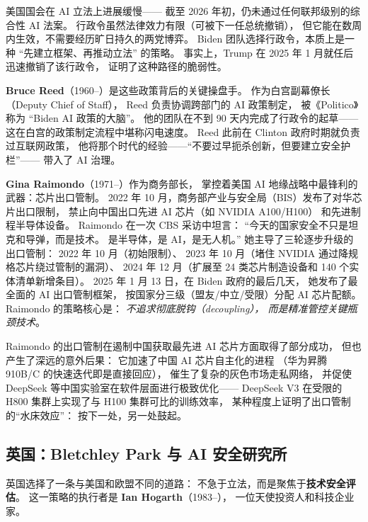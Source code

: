 \begin{whybox}[为什么行政令而非立法？]
美国国会在 AI 立法上进展缓慢——
截至 2026 年初，仍未通过任何联邦级别的综合性 AI 法案。
行政令虽然法律效力有限（可被下一任总统撤销），
但它能在数周内生效，不需要经历旷日持久的两党博弈。
Biden 团队选择行政令，本质上是一种
``先建立框架、再推动立法'' 的策略。
事实上，Trump 在 2025 年 1 月就任后迅速撤销了该行政令，
证明了这种路径的脆弱性。
\end{whybox}

\textbf{Bruce Reed}（1960--）是这些政策背后的关键操盘手。
作为白宫副幕僚长（Deputy Chief of Staff），
Reed 负责协调跨部门的 AI 政策制定，
被《Politico》称为 ``Biden AI 政策的大脑''。
他的团队在不到 90 天内完成了行政令的起草——
这在白宫的政策制定流程中堪称闪电速度。
Reed 此前在 Clinton 政府时期就负责过互联网政策，
他将那个时代的经验——``不要过早扼杀创新，但要建立安全护栏''——
带入了 AI 治理。

\textbf{Gina Raimondo}（1971--）作为商务部长，
掌控着美国 AI 地缘战略中最锋利的武器：芯片出口管制。
2022 年 10 月，商务部产业与安全局（BIS）发布了对华芯片出口限制，
禁止向中国出口先进 AI 芯片（如 NVIDIA A100/H100）
和先进制程半导体设备。
Raimondo 在一次 CBS 采访中坦言：
``今天的国家安全不只是坦克和导弹，而是技术。
是半导体，是 AI，是无人机。''
她主导了三轮逐步升级的出口管制：
2022 年 10 月（初始限制）、
2023 年 10 月（堵住 NVIDIA 通过降规格芯片绕过管制的漏洞）、
2024 年 12 月（扩展至 24 类芯片制造设备和 140 个实体清单新增条目）。
2025 年 1 月 13 日，在 Biden 政府的最后几天，
她发布了最全面的 AI 出口管制框架，
按国家分三级（盟友/中立/受限）分配 AI 芯片配额。
Raimondo 的策略核心是：
\emph{不追求彻底脱钩（decoupling），
而是精准管控关键瓶颈技术}。

\begin{corebox}[芯片管制的意外后果]
Raimondo 的出口管制在遏制中国获取最先进 AI 芯片方面取得了部分成功，
但也产生了深远的意外后果：
它加速了中国 AI 芯片自主化的进程
（华为昇腾 910B/C 的快速迭代即是直接回应），
催生了复杂的灰色市场走私网络，
并促使 DeepSeek 等中国实验室在软件层面进行极致优化——
DeepSeek V3 在受限的 H800 集群上实现了与 H100 集群可比的训练效率，
某种程度上证明了出口管制的``水床效应''：
按下一处，另一处鼓起。
\end{corebox}

\subsection{英国：Bletchley Park 与 AI 安全研究所}

英国选择了一条与美国和欧盟不同的道路：
不急于立法，而是聚焦于\textbf{技术安全评估}。
这一策略的执行者是
\textbf{Ian Hogarth}（1983--），
一位天使投资人和科技企业家。

